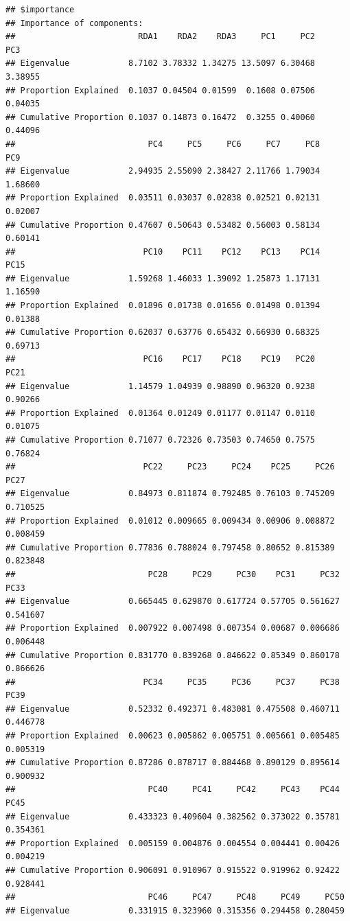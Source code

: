 \documentclass[]{article}
\begin{document}
\begin{verbatim}
## $importance
## Importance of components:
##                         RDA1    RDA2    RDA3     PC1     PC2     PC3
## Eigenvalue            8.7102 3.78332 1.34275 13.5097 6.30468 3.38955
## Proportion Explained  0.1037 0.04504 0.01599  0.1608 0.07506 0.04035
## Cumulative Proportion 0.1037 0.14873 0.16472  0.3255 0.40060 0.44096
##                           PC4     PC5     PC6     PC7     PC8     PC9
## Eigenvalue            2.94935 2.55090 2.38427 2.11766 1.79034 1.68600
## Proportion Explained  0.03511 0.03037 0.02838 0.02521 0.02131 0.02007
## Cumulative Proportion 0.47607 0.50643 0.53482 0.56003 0.58134 0.60141
##                          PC10    PC11    PC12    PC13    PC14    PC15
## Eigenvalue            1.59268 1.46033 1.39092 1.25873 1.17131 1.16590
## Proportion Explained  0.01896 0.01738 0.01656 0.01498 0.01394 0.01388
## Cumulative Proportion 0.62037 0.63776 0.65432 0.66930 0.68325 0.69713
##                          PC16    PC17    PC18    PC19   PC20    PC21
## Eigenvalue            1.14579 1.04939 0.98890 0.96320 0.9238 0.90266
## Proportion Explained  0.01364 0.01249 0.01177 0.01147 0.0110 0.01075
## Cumulative Proportion 0.71077 0.72326 0.73503 0.74650 0.7575 0.76824
##                          PC22     PC23     PC24    PC25     PC26     PC27
## Eigenvalue            0.84973 0.811874 0.792485 0.76103 0.745209 0.710525
## Proportion Explained  0.01012 0.009665 0.009434 0.00906 0.008872 0.008459
## Cumulative Proportion 0.77836 0.788024 0.797458 0.80652 0.815389 0.823848
##                           PC28     PC29     PC30    PC31     PC32     PC33
## Eigenvalue            0.665445 0.629870 0.617724 0.57705 0.561627 0.541607
## Proportion Explained  0.007922 0.007498 0.007354 0.00687 0.006686 0.006448
## Cumulative Proportion 0.831770 0.839268 0.846622 0.85349 0.860178 0.866626
##                          PC34     PC35     PC36     PC37     PC38     PC39
## Eigenvalue            0.52332 0.492371 0.483081 0.475508 0.460711 0.446778
## Proportion Explained  0.00623 0.005862 0.005751 0.005661 0.005485 0.005319
## Cumulative Proportion 0.87286 0.878717 0.884468 0.890129 0.895614 0.900932
##                           PC40     PC41     PC42     PC43    PC44     PC45
## Eigenvalue            0.433323 0.409604 0.382562 0.373022 0.35781 0.354361
## Proportion Explained  0.005159 0.004876 0.004554 0.004441 0.00426 0.004219
## Cumulative Proportion 0.906091 0.910967 0.915522 0.919962 0.92422 0.928441
##                           PC46     PC47     PC48     PC49     PC50
## Eigenvalue            0.331915 0.323960 0.315356 0.294458 0.280459

\end{verbatim}
\end{document}
